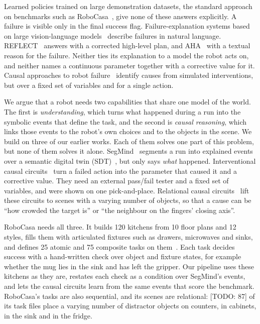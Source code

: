 \documentclass[letterpaper, 10 pt, conference]{ieeeconf}
\newcommand{\todo}[1]{{\color{red}[TODO: #1]}}
\newcommand{\todo}[1]{}
\newcommand{\robocasa}{RoboCasa}
\newcommand{\segmind}{SegMind}
\newcommand{\sdt}{SDT}
\begin{document}
Learned policies trained on large demonstration datasets, the standard approach
on benchmarks such as \robocasa{}~\cite{nasiriany2024robocasa}, give none of
these answers explicitly. A failure is visible only in the final success flag.
Failure-explanation systems based on large vision-language
models~\cite{liu2023reflect,duan2024aha} describe failures in natural language.
REFLECT~\cite{liu2023reflect} answers with a corrected high-level plan, and
AHA~\cite{duan2024aha} with a textual reason for the failure. Neither ties its
explanation to a model the robot acts on, and neither names a continuous
parameter together with a corrective value for it. Causal approaches to
robot failure~\cite{diehl2022why} identify causes from simulated interventions,
but over a fixed set of variables and for a single action.

We argue that a robot needs two capabilities that share one model of the world.
The first is \emph{understanding}, which turns what happened during a run
into the symbolic events that define the task, and the second is \emph{causal
reasoning}, which links those events to the robot's own choices and to the
objects in the scene. We build on three of our earlier works. Each of them
solves one part of this problem, but none of them solves it alone.
\segmind{}~\cite{arion2026segmind} segments a run into explained events over a
semantic digital twin (\sdt{})~\cite{kuempel2021sdt}, but only says \emph{what}
happened. Interventional causal circuits~\cite{vasantakumaar2026icc} turn a
failed action into the parameter that caused it and a corrective value. They
need an external pass/fail tester and a fixed set of variables, and were shown
on one pick-and-place. Relational causal circuits~\cite{anon2027relational} lift
these circuits to scenes with a varying number of objects, so that a cause can
be ``how crowded the target is'' or ``the neighbour on the fingers' closing
axis''.

\robocasa{} needs all three. It builds 120 kitchens from 10 floor plans and 12
styles, fills them with articulated fixtures such as drawers, microwaves and
sinks, and defines 25 atomic and 75 composite tasks on
them~\cite{nasiriany2024robocasa}. Each task decides success with a hand-written
check over object and fixture states, for example whether the mug lies in the
sink and has left the gripper. Our pipeline uses these kitchens as they are,
restates each check as a condition over \segmind{}'s events, and lets the causal
circuits learn from the same events that score the benchmark.
\robocasa{}'s tasks are also sequential, and its scenes are relational:
\todo{87} of its task files place
a varying number of distractor objects on counters, in cabinets, in the sink and
in the fridge.
\end{document}
